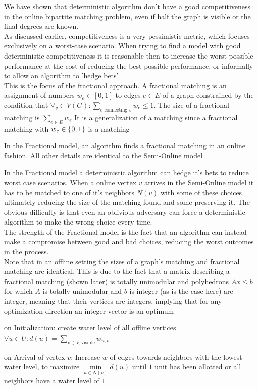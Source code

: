 We have shown that deterministic algorithm don't have a good competitiveness in the online bipartite matching problem, even if half the graph is visible or the final degrees are known.\\
As discussed earlier, competitiveness is a very pessimistic metric, which focuses exclusively on a worst-case scenario. When trying to find a model with good deterministic competitiveness it is reasonable then to increase the worst possible performance at the cost of reducing the best possible performance, or informally to allow an algorithm to 'hedge bets'\\
This is the focus of the fractional approach. A fractional matching is an assignment of numbers $w_e\in[0,1]$ to edges $e\in E$ of a graph constrained by the condition that $\forall_v\in V(G):\sum\limits_{e\text{ connecting }v}w_e\leq 1$. The size of a fractional matching is $\sum\limits_{e\in E}w_e$
It is a generalization of a matching since a fractional matching with $w_e\in\{0,1\}$ is a matching\\
\begin{definition}
	In the Fractional model, an algorithm finds a fractional matching in an online fashion. All other details are identical to the Semi-Online model
\end{definition}
In the Fractional model a deterministic algorithm can hedge it's bets to reduce worst case scenarios. When a online vertex $v$ arrives in the Semi-Online model it has to be matched to one of it's neighbors $N(v)$ with some of these choices ultimately reducing the size of the matching found and some preserving it. The obvious difficulty is that even an oblivious adversary can force a deterministic algorithm to make the wrong choice every time.\\
The strength of the Fractional model is the fact that an algorithm can instead make a compromise between good and bad choices, reducing the worst outcomes in the process.\\
Note that in an offline setting the sizes of a graph's matching and fractional matching are identical. This is due to the fact that a matrix describing a fractional matching (shown later) is totally unimodular and polyhedrons $Ax\leq b$ for which $A$ is totally unimodular and $b$ is integer (as is the case here) are integer, meaning that their vertices are integers, implying that for any optimization direction an integer vector is an optimum
\begin{algorithm}
	\caption{Waterlevel}
	\label{alg:waterlevel}
	\begin{algorithmic}
		\item on Initialization: create water level of all offline vertices $\forall u\in U:d(u)=\sum\limits_{v\in V,\text{visible}}w_{u,v}$
		\item on Arrival of vertex $v$: Increase $w$ of edges towards neighbors with the lowest water level, to maximize $\underset{u\in N(v)}{\min}d(u)$ until $1$ unit has been allotted or all neighbors have a water level of $1$
	\end{algorithmic}
\end{algorithm}


